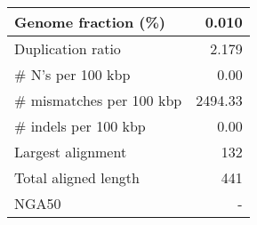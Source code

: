 \documentclass[12pt,a4paper]{article}
\begin{document}
\begin{table}[ht]
\begin{center}
\begin{tabular}{|l*{1}{|r}|}
Genome fraction (\%) & 0.010 \\ \hline
Duplication ratio & 2.179 \\ \hline
\# N's per 100 kbp & 0.00 \\ \hline
\# mismatches per 100 kbp & 2494.33 \\ \hline
\# indels per 100 kbp & 0.00 \\ \hline
Largest alignment & 132 \\ \hline
Total aligned length & 441 \\ \hline
NGA50 & - \\ \hline
\end{tabular}
\end{center}
\end{table}
\end{document}
